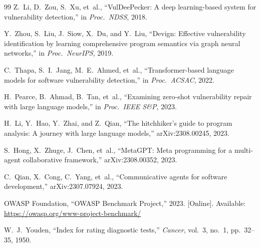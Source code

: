 \documentclass[conference]{IEEEtran}
\begin{document}
\begin{thebibliography}{99}
Z.~Li, D.~Zou, S.~Xu, et~al., ``VulDeePecker: A deep learning-based system for vulnerability detection,'' in \textit{Proc.\ NDSS}, 2018.

Y.~Zhou, S.~Liu, J.~Siow, X.~Du, and Y.~Liu, ``Devign: Effective vulnerability identification by learning comprehensive program semantics via graph neural networks,'' in \textit{Proc.\ NeurIPS}, 2019.

C.~Thapa, S.~I.~Jang, M.~E.~Ahmed, et~al., ``Transformer-based language models for software vulnerability detection,'' in \textit{Proc.\ ACSAC}, 2022.

H.~Pearce, B.~Ahmad, B.~Tan, et~al., ``Examining zero-shot vulnerability repair with large language models,'' in \textit{Proc.\ IEEE S\&P}, 2023.

H.~Li, Y.~Hao, Y.~Zhai, and Z.~Qian, ``The hitchhiker's guide to program analysis: A journey with large language models,'' arXiv:2308.00245, 2023.

S.~Hong, X.~Zhuge, J.~Chen, et~al., ``MetaGPT: Meta programming for a multi-agent collaborative framework,'' arXiv:2308.00352, 2023.

C.~Qian, X.~Cong, C.~Yang, et~al., ``Communicative agents for software development,'' arXiv:2307.07924, 2023.

OWASP Foundation, ``OWASP Benchmark Project,'' 2023. [Online]. Available: \url{https://owasp.org/www-project-benchmark/}

W.~J.~Youden, ``Index for rating diagnostic tests,'' \textit{Cancer}, vol.~3, no.~1, pp.~32--35, 1950.

\end{thebibliography}
\end{document}
